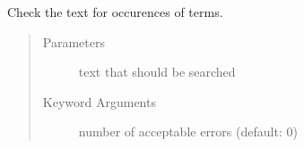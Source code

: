 \documentclass[letterpaper,10pt,english]{sphinxmanual}
\begin{document}
\begin{fulllineitems}
\begin{fulllineitems}
\begin{quote}
\begin{description}
\end{description}\end{quote}

\end{fulllineitems}


\begin{fulllineitems}
\label{\detokenize{api:simple_check.SimpleCheck.simple_check_text}}
Check the text for occurences of terms.
\begin{quote}\begin{description}
\item[{Parameters}] \leavevmode
{} \textendash{} text that should be searched

\item[{Keyword Arguments}] \leavevmode
{} \textendash{} number of acceptable errors (default: 0)

\end{description}\end{quote}

\end{fulllineitems}


\end{fulllineitems}

\label{\detokenize{api:module-approx_str_matching}}
\end{document}
